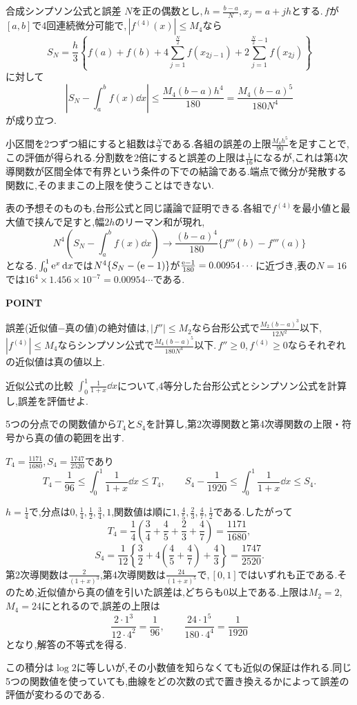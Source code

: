 \begin{theorem}{合成シンプソン公式と誤差}
$N$を正の偶数とし,\,$h=\frac{b-a}{N}$,\,$x_j=a+jh$とする.\,$f$が$[a,b]$で4回連続微分可能で,\,$|f^{(4)}(x)|\le M_4$なら
\[
 S_N=\frac h3\left\{f(a)+f(b)
 +4\sum_{j=1}^{\frac N2}f(x_{2j-1})
 +2\sum_{j=1}^{\frac N2-1}f(x_{2j})\right\}
\]
に対して
\[
 \left|S_N-\int_a^bf(x)\dd x\right|
 \le\frac{M_4(b-a)h^4}{180}
 =\frac{M_4(b-a)^5}{180N^4}
\]
が成り立つ.
\end{theorem}

小区間を2つずつ組にすると組数は$\frac N2$である.各組の誤差の上限$\frac{M_4h^5}{90}$を足すことで,この評価が得られる.分割数を2倍にすると誤差の上限は$\frac1{16}$になるが,これは第4次導関数が区間全体で有界という条件の下での結論である.端点で微分が発散する関数に,そのままこの上限を使うことはできない.

表の予想そのものも,台形公式と同じ議論で証明できる.各組で$f^{(4)}$を最小値と最大値で挟んで足すと,幅$2h$のリーマン和が現れ,
\[
 N^4\left(S_N-\int_a^bf(x)\dd x\right)
 \longrightarrow\frac{(b-a)^4}{180}\{f'''(b)-f'''(a)\}
\]
となる.\,$\int_0^1\mathrm{e}^x\,\mathrm{d} x$では$N^4\{S_N-(\mathrm{e}-1)\}$が$\frac{\mathrm{e}-1}{180}=0.00954\cdots$に近づき,表の$N=16$では$16^4\times1.456\times10^{-7}=0.00954\cdots$である.

\begin{bookpoint}
\textbf{POINT}\par
誤差(近似値$-$真の値)の絶対値は,\,$|f''|\le M_2$なら台形公式で$\frac{M_2(b-a)^3}{12N^2}$以下,\,$|f^{(4)}|\le M_4$ならシンプソン公式で$\frac{M_4(b-a)^5}{180N^4}$以下.\,$f''\ge0$,\,$f^{(4)}\ge0$ならそれぞれの近似値は真の値以上.
\end{bookpoint}

\begin{example}{近似公式の比較}
$\int_0^1\frac1{1+x}\dd x$について,4等分した台形公式とシンプソン公式を計算し,誤差を評価せよ.
\end{example}

5つの分点での関数値から$T_4$と$S_4$を計算し,第2次導関数と第4次導関数の上限・符号から真の値の範囲を出す.

$T_4=\frac{1171}{1680}$,\,$S_4=\frac{1747}{2520}$であり
\[
 T_4-\frac1{96}\le\int_0^1\frac1{1+x}\dd x\le T_4,
 \qquad
 S_4-\frac1{1920}\le\int_0^1\frac1{1+x}\dd x\le S_4.
\]

$h=\frac14$で,分点は$0,\frac14,\frac12,\frac34,1$,関数値は順に$1,\frac45,\frac23,\frac47,\frac12$である.したがって
\[
 T_4=\frac14\left(\frac34+\frac45+\frac23+\frac47\right)
 =\frac{1171}{1680},
\]
\[
 S_4=\frac1{12}\left\{\frac32+4\left(\frac45+\frac47\right)+\frac43\right\}
 =\frac{1747}{2520}.
\]
第2次導関数は$\frac2{(1+x)^3}$,第4次導関数は$\frac{24}{(1+x)^5}$で,\,$[0,1]$ではいずれも正である.そのため,近似値から真の値を引いた誤差は,どちらも$0$以上である.上限は$M_2=2$,\,$M_4=24$にとれるので,誤差の上限は
\[
 \frac{2\cdot1^3}{12\cdot4^2}=\frac1{96},\qquad
 \frac{24\cdot1^5}{180\cdot4^4}=\frac1{1920}
\]
となり,解答の不等式を得る.

この積分は$\log2$に等しいが,その小数値を知らなくても近似の保証は作れる.同じ5つの関数値を使っていても,曲線をどの次数の式で置き換えるかによって誤差の評価が変わるのである.
